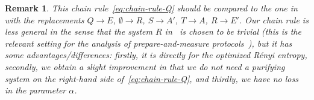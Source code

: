 \documentclass[11pt]{article}
\newcommand{\1}{\ensuremath{\mathbbm{1}}}
\theoremstyle{newdefinition}
\theoremstyle{newplain}
\newtheorem{remark}[definition]{Remark}
\theoremstyle{myplain}
\begin{document}
\begin{remark}
This chain rule~\eqref{eq:chain-rule-Q} should be compared to the one in~\cite[Lemma 3.6]{Metger.2024} with the replacements $Q \to E$, $\emptyset \to R$, $S \to A'$, $T \to A$, $R \to E'$. Our chain rule is less general in the sense that the system $R$ in~\cite[Lemma 3.6]{Metger.2024} is chosen to be trivial (this is the relevant setting for the analysis of prepare-and-measure protocols~\cite{Metger.2023}), but it has some advantages/differences: firstly, it is directly for the optimized R\'enyi entropy, secondly, we obtain a slight improvement in that we do not need a purifying system on the right-hand side of~\eqref{eq:chain-rule-Q},  and thirdly, we have no loss in the parameter $\alpha$. 
  
\end{remark}
\end{document}
